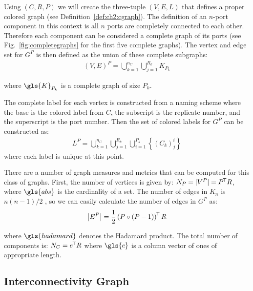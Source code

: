 Using $({C},{R},{P})$ we will create the three-tuple $({V},{E},{L})$ that defines a proper colored graph (see Definition~\ref{def:ch2:cgraph}). The definition of an $n$-port component in this context is all $n$ ports are completely connected to each other. Therefore each component can be considered a complete graph of its ports (see Fig.~\ref{fig:completegraphs} for the first five complete graphs). The vertex and edge set for $G^{P}$ is then defined as the union of these complete subgraphs:
\begin{align}
({V},{E})^{P} = \bigcup_{k=1}^{n_C} \bigcup_{j=1}^{R_k} K_{P_k}
\end{align}

\noindent where $\gls{K}_{P_k}$ is a complete graph of size $P_k$.



The complete label for each vertex is constructed from a naming scheme where the base is the colored label from ${C}$, the subscript is the replicate number, and the superscript is the port number. Then the set of colored labels for $G^{P}$ can be constructed as:
\begin{align}
{L}^{P} = \bigcup_{k=1}^{n_C} \bigcup_{j=1}^{R_k} \bigcup_{i=1}^{P_k} \left\lbrace (C_k)_j^i \right\rbrace
\end{align}
\noindent where each label is unique at this point.

There are a number of graph measures and metrics that can be computed for this class of graphs. First, the number of vertices is given by: $N_P = \abs{{V}^{P}} = {P}\tran {R}$, where $\gls{abs}$ is the cardinality of a set. The number of edges in $K_n$ is $n(n-1)/2$ \cite[p.~22]{Godsil2001a}, so we can easily calculate the number of edges in $G^{P}$ as:
\begin{align}
\abs*{{E}^{P}} = \frac{1}{2} \left( {P}  \circ \left( {P} - 1 \right) \right)\tran {R}
\end{align}

\noindent where $\gls{hadamard}$ denotes the Hadamard product. The total number of components is: $N_C = e\tran {R}$ where $\gls{e}$ is a column vector of ones of appropriate length.

\subsection{Interconnectivity Graph\label{sec:ch2:inter}}

